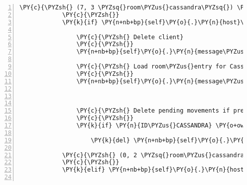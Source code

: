 \begin{Verbatim}[commandchars=\\\{\},numbers=left,firstnumber=1,stepnumber=1]
            \PY{c}{\PYZsh{} (7, 3 \PYZsq{}room\PYZus{}cassandra\PYZsq{}) \PYZhy{}\PYZgt{} Teleports Cassandra to \PYZsq{}room\PYZus{}entry\PYZsq{})}
            \PY{c}{\PYZsh{}}
            \PY{k}{if} \PY{n+nb+bp}{self}\PY{o}{.}\PY{n}{host}\PY{o}{.}\PY{n}{room\PYZus{}by\PYZus{}client}\PY{p}{[}\PY{n}{ID\PYZus{}CASSANDRA}\PY{p}{]}\PY{o}{.}\PY{n}{entity\PYZus{}locations}\PY{p}{[}\PY{n}{ID\PYZus{}CASSANDRA}\PY{p}{]} \PY{o}{==} \PY{p}{(}\PY{l+m+mi}{7}\PY{p}{,} \PY{l+m+mi}{3}\PY{p}{)}\PY{p}{:}

                \PY{c}{\PYZsh{} Delete client}
                \PY{c}{\PYZsh{}}
                \PY{n+nb+bp}{self}\PY{o}{.}\PY{n}{message\PYZus{}for\PYZus{}host}\PY{o}{.}\PY{n}{event\PYZus{}list}\PY{o}{.}\PY{n}{append}\PY{p}{(}\PY{n}{fabula}\PY{o}{.}\PY{n}{DeleteEvent}\PY{p}{(}\PY{n}{ID\PYZus{}CASSANDRA}\PY{p}{)}\PY{p}{)}

                \PY{c}{\PYZsh{} Load room\PYZus{}entry for Cassandra and spawn her at position (5, 3)}
                \PY{c}{\PYZsh{}}
                \PY{n+nb+bp}{self}\PY{o}{.}\PY{n}{message\PYZus{}for\PYZus{}host}\PY{o}{.}\PY{n}{event\PYZus{}list}\PY{o}{.}\PY{n}{extend}\PY{p}{(}\PY{n+nb+bp}{self}\PY{o}{.}\PY{n}{\PYZus{}load\PYZus{}room}\PY{p}{(}\PY{n}{ID\PYZus{}CASSANDRA}\PY{p}{,}
                                                                        \PY{l+s}{\PYZdq{}}\PY{l+s}{room\PYZus{}entry}\PY{l+s}{\PYZdq{}}\PY{p}{,}
                                                                        \PY{p}{(}\PY{l+m+mi}{5}\PY{p}{,} \PY{l+m+mi}{3}\PY{p}{)}\PY{p}{)}\PY{p}{)}

                \PY{c}{\PYZsh{} Delete pending movements if present}
                \PY{c}{\PYZsh{}}
                \PY{k}{if} \PY{n}{ID\PYZus{}CASSANDRA} \PY{o+ow}{in} \PY{n+nb+bp}{self}\PY{o}{.}\PY{n}{tries\PYZus{}to\PYZus{}move\PYZus{}dict}\PY{o}{.}\PY{n}{keys}\PY{p}{(}\PY{p}{)}\PY{p}{:}

                    \PY{k}{del} \PY{n+nb+bp}{self}\PY{o}{.}\PY{n}{tries\PYZus{}to\PYZus{}move\PYZus{}dict}\PY{p}{[}\PY{n}{ID\PYZus{}CASSANDRA}\PY{p}{]}

            \PY{c}{\PYZsh{} (0, 2 \PYZsq{}room\PYZus{}cassandra\PYZsq{}) \PYZhy{}\PYZgt{} Teleports Cassandra to \PYZsq{}room\PYZus{}default\PYZsq{})}
            \PY{c}{\PYZsh{}}
            \PY{k}{elif} \PY{n+nb+bp}{self}\PY{o}{.}\PY{n}{host}\PY{o}{.}\PY{n}{room\PYZus{}by\PYZus{}client}\PY{p}{[}\PY{n}{ID\PYZus{}CASSANDRA}\PY{p}{]}\PY{o}{.}\PY{n}{entity\PYZus{}locations}\PY{p}{[}\PY{n}{ID\PYZus{}CASSANDRA}\PY{p}{]} \PY{o}{==} \PY{p}{(}\PY{l+m+mi}{0}\PY{p}{,} \PY{l+m+mi}{2}\PY{p}{)}\PY{p}{:}


\end{Verbatim}
